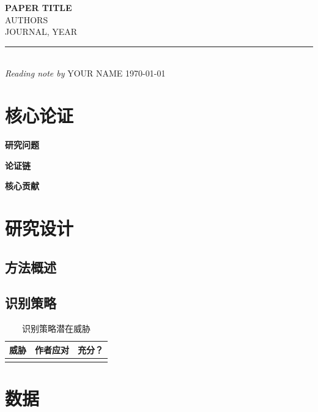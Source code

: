 \documentclass[11pt, a4paper]{article}
\begin{document}
\begin{center}
  {\Large\bfseries PAPER TITLE}\\[6pt]    %
  {\normalsize AUTHORS}\\[3pt]            %
  {\small JOURNAL, YEAR}\\[3pt]           %
  \rule{0.5\linewidth}{0.4pt}\\[3pt]
  {\small\textit{Reading note by} YOUR NAME \quad \today}  %
\end{center}

\vspace{8pt}

\section{核心论证}

\textbf{研究问题}

\textbf{论证链}

\textbf{核心贡献}

\section{研究设计}

\subsection{方法概述}

\subsection{识别策略}

\begin{table}[h]
\centering
\small
\begin{tabularx}{\linewidth}{lXl}
\toprule
威胁 & 作者应对 & 充分？ \\
\midrule
 &  &  \\
\bottomrule
\end{tabularx}
\caption{识别策略潜在威胁}
\end{table}

\section{数据}
\end{document}
